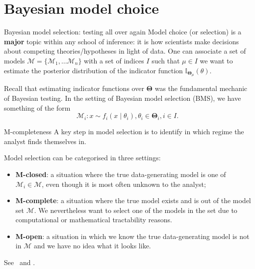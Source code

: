 \section*{Bayesian model choice}
\begin{frame}{Bayesian model selection: testing all over again}
 Model choice (or selection) is a \textbf{major} topic within any school of inference: it is how scientists make decisions about competing theories/hypotheses in light of data.
 One can associate a set of models $\boldsymbol{\mathcal{M}} = \{ \mathcal{M}_1, \ldots \mathcal{M}_n \}$ with a set of indices $I$ such that $\mu \in I$ we want to estimate the posterior distribution of the indicator function $\mathbb{I}_{\boldsymbol{\Theta}_\mu}(\theta)$.
 
 Recall that estimating indicator functions over $\boldsymbol{\Theta}$ was the fundamental mechanic of Bayesian testing.
 In the setting of Bayesian model selection (BMS), we have something of the form
 \begin{equation*}
  \mathcal{M}_i : x \sim f_i(x \mid \theta_i), \theta_i \in \boldsymbol{\Theta}_i, i \in I.
 \end{equation*}
\end{frame}
\begin{frame}{M-completeness}
A key step in model selection is to identify in which regime the analyst finds themselves in.
\begin{defn}
 \label{def:m-open}
 Model selection can be categorised in three settings:
 \begin{itemize}
  \item \textbf{M-closed}: a situation where the true data-generating model is one of $\mathcal{M}_i \in \boldsymbol{\mathcal{M}}$, even though  it is most often  unknown to the  analyst;
  \item \textbf{M-complete}: a situation where the true model exists and is out of the model set $\boldsymbol{\mathcal{M}}$.
  We nevertheless want to select one of the models in the set due to computational or mathematical tractability reasons.
  \item \textbf{M-open}: a situation in which we know the true data-generating model is not in $\boldsymbol{\mathcal{M}}$ and we have no idea what it looks like.
 \end{itemize}
\end{defn}
See~\cite{Bernardo2000} and \cite{Yao2018}.
\end{frame}
